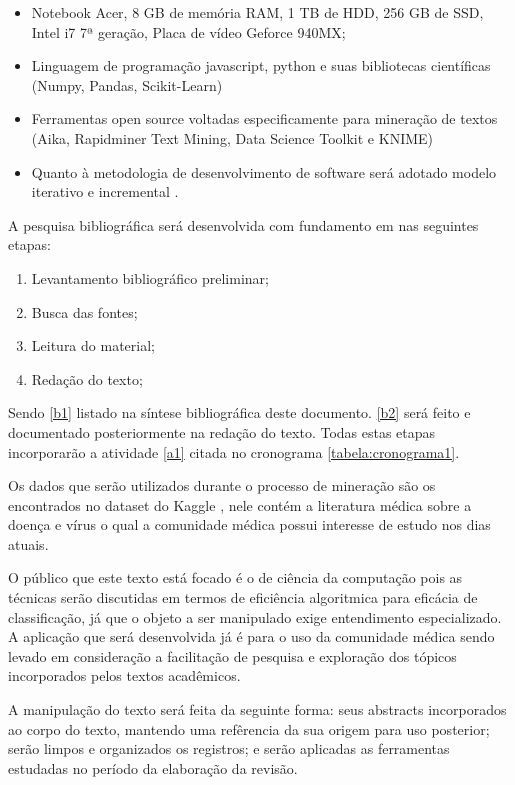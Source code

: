 \documentclass[
	12pt,				%
	a4paper,			%
	english,			%
	brazil,				%
	]{article}
\begin{document}
\begin{itemize}
\item Notebook Acer, 8 GB de memória RAM, 1 TB de HDD, 256 GB de SSD, Intel i7 7ª gera{\c c}\~ ao, Placa de v\' ideo Geforce 940MX;
\item Linguagem de programa\c c\~ ao javascript, python e suas bibliotecas cient\' ificas (Numpy, Pandas, Scikit-Learn)
\item Ferramentas open source voltadas especificamente para minera\c c\~ ao de textos (Aika, Rapidminer Text Mining, Data Science Toolkit e KNIME)
\item Quanto à metodologia de desenvolvimento de software ser\' a adotado modelo iterativo e incremental \cite{pressman2016engenharia}.
\end{itemize}

   A pesquisa bibliográfica será desenvolvida com fundamento em \cite{lakatos2001metodologia} nas seguintes etapas:
   \begin{enumerate}
\item Levantamento bibliográfico preliminar; \label{b1}
\item Busca das fontes; \label{b2}
\item Leitura do material; \label{b3}
\item Redação do texto; \label{b4}
   \end{enumerate}
   
   Sendo \ref{b1} listado na síntese bibliográfica deste documento. \ref{b2} será feito e documentado posteriormente na redação do texto. Todas estas etapas incorporarão a atividade \ref{a1} citada no cronograma \ref{tabela:cronograma1}.

Os dados que serão utilizados durante o processo de mineração são os encontrados no dataset do Kaggle \cite{kaggle20online}, nele contém a literatura médica sobre a doença e vírus o qual a comunidade médica possui interesse de estudo nos dias atuais.

O público que este texto está focado é o de ciência da computação pois as técnicas serão discutidas em termos de eficiência algoritmica para eficácia de classificação, já que o objeto a ser manipulado exige entendimento especializado. A aplicação que será desenvolvida já é para o uso da comunidade médica sendo levado em consideração a facilitação de pesquisa e exploração dos tópicos incorporados pelos textos acadêmicos.

A manipulação do texto será feita da seguinte forma: seus abstracts incorporados ao corpo do texto, mantendo uma refêrencia da sua origem para uso posterior; serão limpos e organizados os registros; e serão aplicadas as ferramentas estudadas no período da elaboração da revisão.
\end{document}
